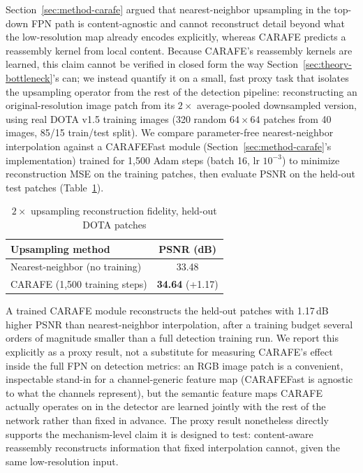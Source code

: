 \documentclass[conference]{IEEEtran}
\begin{document}
Section~\ref{sec:method-carafe} argued that nearest-neighbor upsampling in
the top-down FPN path is content-agnostic and cannot reconstruct detail
beyond what the low-resolution map already encodes explicitly, whereas
CARAFE predicts a reassembly kernel from local content. Because CARAFE's
reassembly kernels are learned, this claim cannot be verified in closed
form the way Section~\ref{sec:theory-bottleneck}'s can; we instead
quantify it on a small, fast proxy task that isolates the upsampling
operator from the rest of the detection pipeline: reconstructing an
original-resolution image patch from its $2\times$ average-pooled
downsampled version, using real DOTA v1.5 training images (320 random
$64\times64$ patches from 40 images, 85/15 train/test split). We compare
parameter-free nearest-neighbor interpolation against a CARAFEFast module
(Section~\ref{sec:method-carafe}'s implementation) trained for 1,500 Adam
steps (batch 16, lr $10^{-3}$) to minimize reconstruction MSE on the
training patches, then evaluate PSNR on the held-out test patches
(Table~\ref{tab:carafe}).

\begin{table}[htbp]
\caption{$2\times$ upsampling reconstruction fidelity, held-out DOTA patches}
\label{tab:carafe}
\centering
\begin{tabular}{lc}
\toprule
Upsampling method & PSNR (dB) \\
\midrule
Nearest-neighbor (no training) & 33.48 \\
CARAFE (1,500 training steps)  & \textbf{34.64} (+1.17) \\
\bottomrule
\end{tabular}
\end{table}

A trained CARAFE module reconstructs the held-out patches with 1.17\,dB
higher PSNR than nearest-neighbor interpolation, after a training budget
several orders of magnitude smaller than a full detection training run.
We report this explicitly as a proxy result, not a substitute for
measuring CARAFE's effect inside the full FPN on detection metrics: an
RGB image patch is a convenient, inspectable stand-in for a
channel-generic feature map (CARAFEFast is agnostic to what the channels
represent), but the semantic feature maps CARAFE actually operates on in
the detector are learned jointly with the rest of the network rather than
fixed in advance. The proxy result nonetheless directly supports the
mechanism-level claim it is designed to test: content-aware reassembly
reconstructs information that fixed interpolation cannot, given the same
low-resolution input.
\end{document}
